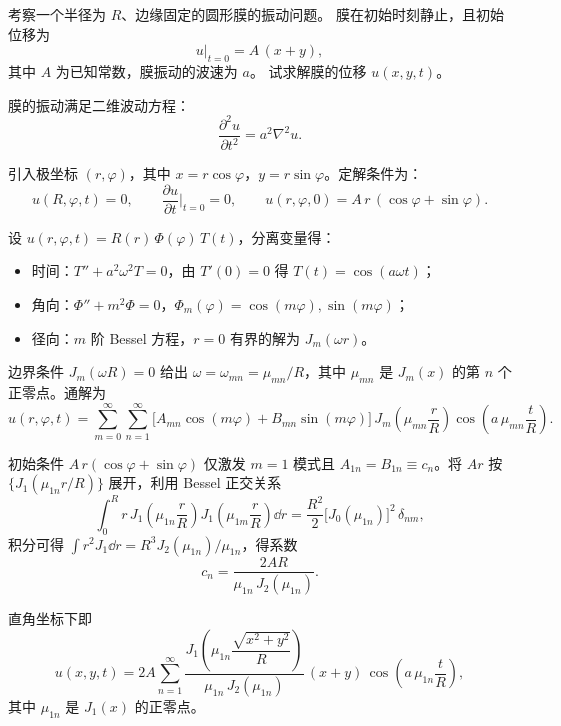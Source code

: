﻿
\begin{question}[圆形膜的振动]

考察一个半径为 $R$、边缘固定的圆形膜的振动问题。
膜在初始时刻静止，且初始位移为
\[
u\big|_{t=0} = A\,(x + y),
\]
其中 $A$ 为已知常数，膜振动的波速为 $a$。
试求解膜的位移 $u(x,y,t)$。

\begin{solution}

膜的振动满足二维波动方程：
\[
\frac{\partial^{2} u}{\partial t^{2}} = a^{2} \nabla^{2} u.
\]

引入极坐标 $(r,\varphi)$，其中 $x = r\cos\varphi$，$y = r\sin\varphi$。定解条件为：
\[
u(R,\varphi,t) = 0,\qquad
\frac{\partial u}{\partial t}\Big|_{t=0} = 0,\qquad
u(r,\varphi,0) = A\,r\,(\cos\varphi + \sin\varphi).
\]

设 $u(r,\varphi,t) = R(r)\,\Phi(\varphi)\,T(t)$，分离变量得：
\begin{itemize}
  \item 时间：$T'' + a^{2}\omega^{2} T = 0$，由 $T'(0)=0$ 得 $T(t)=\cos(a\omega t)$；
  \item 角向：$\Phi''+m^{2}\Phi=0$，$\Phi_m(\varphi)=\cos(m\varphi),\sin(m\varphi)$；
  \item 径向：$m$ 阶 Bessel 方程，$r=0$ 有界的解为 $J_{m}(\omega r)$。
\end{itemize}

边界条件 $J_{m}(\omega R)=0$ 给出 $\omega = \omega_{mn} = \mu_{mn}/R$，其中 $\mu_{mn}$ 是 $J_{m}(x)$ 的第 $n$ 个正零点。通解为
\[
u(r,\varphi,t) = \sum_{m=0}^{\infty}\sum_{n=1}^{\infty}
\bigl[A_{mn}\cos(m\varphi) + B_{mn}\sin(m\varphi)\bigr]\,
J_{m}\!\left(\mu_{mn}\frac{r}{R}\right)
\cos\!\left(a\,\mu_{mn}\frac{t}{R}\right).
\]

初始条件 $A\,r(\cos\varphi+\sin\varphi)$ 仅激发 $m=1$ 模式且 $A_{1n}=B_{1n}\equiv c_n$。将 $Ar$ 按 $\{J_{1}(\mu_{1n}r/R)\}$ 展开，利用 Bessel 正交关系
\[
\int_{0}^{R} r\,J_{1}\!\left(\mu_{1n}\frac{r}{R}\right)
J_{1}\!\left(\mu_{1m}\frac{r}{R}\right)\dd r
= \frac{R^{2}}{2}\bigl[J_{0}(\mu_{1n})\bigr]^{2}\,\delta_{nm},
\]
积分可得 $\int r^{2}J_{1}\dd{r} = R^{3}J_{2}(\mu_{1n})/\mu_{1n}$，得系数
\[
c_{n} = \frac{2AR}{\mu_{1n}\,J_{2}(\mu_{1n})}.
\]


直角坐标下即
\[
u(x,y,t) = 2A\sum_{n=1}^{\infty}
\frac{J_{1}\!\left(\mu_{1n}\dfrac{\sqrt{x^{2}+y^{2}}}{R}\right)}
{\mu_{1n}\,J_{2}(\mu_{1n})}\,
(x + y)\,
\cos\!\left(a\,\mu_{1n}\frac{t}{R}\right),
\]
其中 $\mu_{1n}$ 是 $J_{1}(x)$ 的正零点。

\end{solution}
\end{question}

